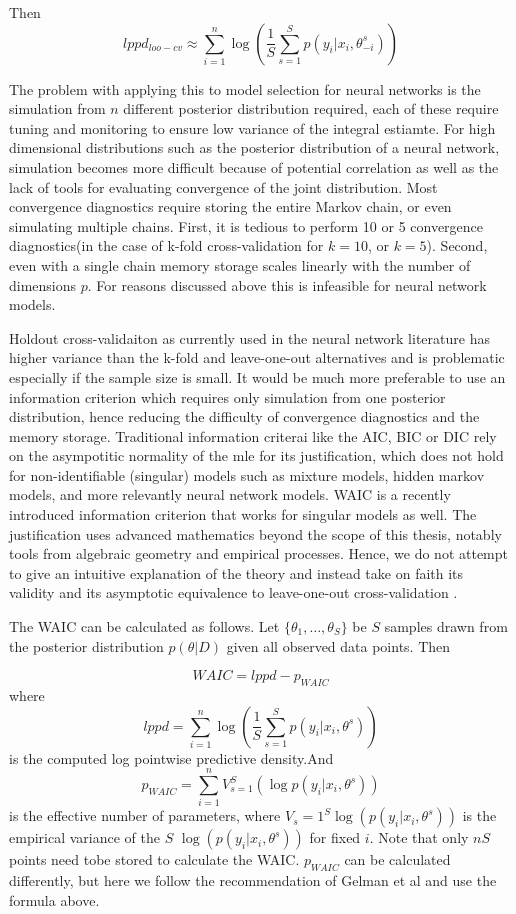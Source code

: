 \documentclass{book}
\begin{document}
\begin{enumerate}
Then
\[lppd_{loo-cv} \approx \sum_{i=1}^n \log (\frac{1}{S} \sum_{s=1}^S
p(y_i|x_i,\theta_{-i}^s))\]

The problem with applying this to model selection for neural networks is the
simulation from $n$ different posterior distribution required, each of these
require tuning and monitoring to ensure low variance of the integral estiamte.
For high dimensional distributions such as the posterior distribution of a neural
network, simulation becomes more difficult because of potential correlation as
well as the lack of tools for evaluating convergence of the joint distribution.
Most convergence diagnostics require storing the entire Markov chain, or even
simulating multiple chains. First, it is tedious to perform 10 or 5 convergence
diagnostics(in the case of k-fold cross-validation for $k=10$, or $k=5$).
Second, even with a single chain memory storage scales
linearly with the number of dimensions $p$. For reasons discussed above this is
infeasible for neural network models. 

Holdout cross-validaiton as currently used in the neural network literature
has higher variance than the k-fold and leave-one-out alternatives and is
problematic especially if the sample size is small. It would be much more
preferable to use an information criterion which requires only simulation from
one posterior distribution, hence reducing the difficulty of convergence
diagnostics and the memory storage. Traditional information criterai like the
AIC, BIC or DIC rely on the asympotitic normality of the mle for its
justification, which does not hold for non-identifiable (singular) models such
as mixture models, hidden markov models, and more relevantly neural network
models. WAIC is a recently introduced information criterion that works for
singular models as well. The justification uses advanced mathematics beyond the
scope of this thesis, notably tools from algebraic geometry and empirical
processes. Hence, we do not attempt to give an intuitive explanation of the
theory and instead take on faith its validity and its asymptotic equivalence to
leave-one-out cross-validation \cite{watanabe2010asymptotic}.

The WAIC can be calculated as follows. Let $\{\theta_1, \dots, \theta_S\}$ be $S$ samples drawn from the posterior distribution $p(\theta|D)$ given all observed data points. Then 

\[WAIC = lppd - p_{WAIC} \]
where 
\[lppd = \sum_{i=1}^n \log( \frac{1}{S} \sum_{s=1}^S p(y_i|x_i,\theta^s) ) \]
is the computed log pointwise predictive density.And 
\[p_{WAIC} = \sum_{i=1}^n V_{s=1}^S(\log p(y_i|x_i, \theta^s)) \]
is the effective number of parameters, where $V_s=1^S \log(p(y_i|x_i,\theta^s))$ is the empirical variance of the $S$  $\log(p(y_i|x_i,\theta^s))$ for fixed $i$. Note that only $nS$ points need tobe stored to calculate the WAIC. $p_{WAIC}$ can be calculated differently, but here we follow the recommendation of Gelman et al and use the formula above.


\end{enumerate}
\end{document}
